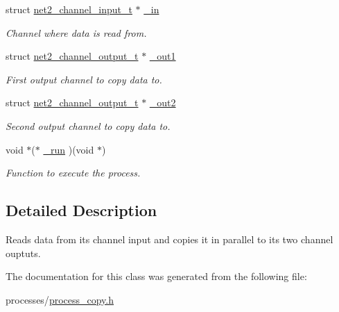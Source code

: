 \begin{DoxyCompactItemize}
\item 
\hypertarget{structprocess__copy__int__t_a81c5105a6213d656c8a927e1438be22b}{struct \hyperlink{structnet2__channel__input__t}{net2\-\_\-channel\-\_\-input\-\_\-t} $\ast$ \hyperlink{structprocess__copy__int__t_a81c5105a6213d656c8a927e1438be22b}{\-\_\-in}}\label{structprocess__copy__int__t_a81c5105a6213d656c8a927e1438be22b}

\begin{DoxyCompactList}\small\item\em Channel where data is read from. \end{DoxyCompactList}\item 
\hypertarget{structprocess__copy__int__t_a291f78ff424b5a6275d71a5c75397e74}{struct \hyperlink{structnet2__channel__output__t}{net2\-\_\-channel\-\_\-output\-\_\-t} $\ast$ \hyperlink{structprocess__copy__int__t_a291f78ff424b5a6275d71a5c75397e74}{\-\_\-out1}}\label{structprocess__copy__int__t_a291f78ff424b5a6275d71a5c75397e74}

\begin{DoxyCompactList}\small\item\em First output channel to copy data to. \end{DoxyCompactList}\item 
\hypertarget{structprocess__copy__int__t_a8f36052501a43e82f2924efa2d04b844}{struct \hyperlink{structnet2__channel__output__t}{net2\-\_\-channel\-\_\-output\-\_\-t} $\ast$ \hyperlink{structprocess__copy__int__t_a8f36052501a43e82f2924efa2d04b844}{\-\_\-out2}}\label{structprocess__copy__int__t_a8f36052501a43e82f2924efa2d04b844}

\begin{DoxyCompactList}\small\item\em Second output channel to copy data to. \end{DoxyCompactList}\item 
\hypertarget{structprocess__copy__int__t_ad8f7df5716069119c549664a0174f379}{void $\ast$($\ast$ \hyperlink{structprocess__copy__int__t_ad8f7df5716069119c549664a0174f379}{\-\_\-run} )(void $\ast$)}\label{structprocess__copy__int__t_ad8f7df5716069119c549664a0174f379}

\begin{DoxyCompactList}\small\item\em Function to execute the process. \end{DoxyCompactList}\end{DoxyCompactItemize}


\subsection{Detailed Description}
Reads data from its channel input and copies it in parallel to its two channel ouptuts. 

The documentation for this class was generated from the following file\-:\begin{DoxyCompactItemize}
\item 
processes/\hyperlink{process__copy_8h}{process\-\_\-copy.\-h}\end{DoxyCompactItemize}
